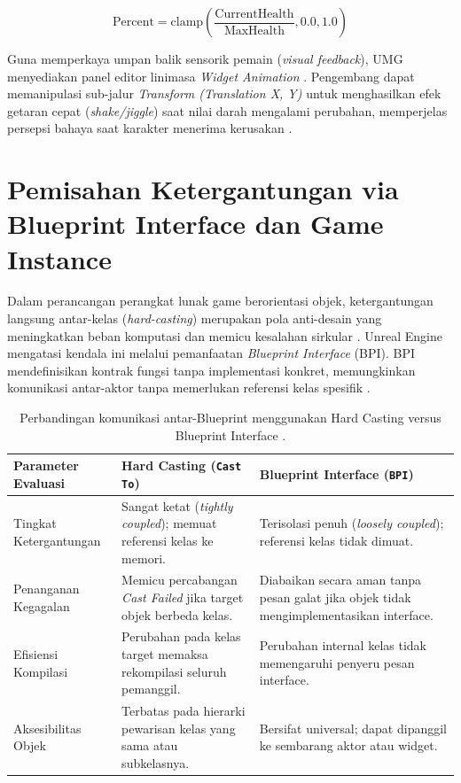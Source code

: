 \documentclass[a4paper,oneside,12pt]{report}
\begin{document}
\begin{equation}
	\text{Percent} = \text{clamp}\left(\frac{\text{CurrentHealth}}{\text{MaxHealth}}, 0.0, 1.0\right)
\end{equation}

Guna memperkaya umpan balik sensorik pemain (\textit{visual feedback}), UMG menyediakan panel editor linimasa \textit{Widget Animation} \cite{epic-widget-animation}. Pengembang dapat memanipulasi sub-jalur \textit{Transform (Translation X, Y)} untuk menghasilkan efek getaran cepat (\textit{shake/jiggle}) saat nilai darah mengalami perubahan, memperjelas persepsi bahaya saat karakter menerima kerusakan \cite{modul7}.

\section{Pemisahan Ketergantungan via Blueprint Interface dan Game Instance}
Dalam perancangan perangkat lunak game berorientasi objek, ketergantungan langsung antar-kelas (\textit{hard-casting}) merupakan pola anti-desain yang meningkatkan beban komputasi dan memicu kesalahan sirkular \cite{epic-blueprint-interface}. Unreal Engine mengatasi kendala ini melalui pemanfaatan \textit{Blueprint Interface} (BPI). BPI mendefinisikan kontrak fungsi tanpa implementasi konkret, memungkinkan komunikasi antar-aktor tanpa memerlukan referensi kelas spesifik \cite{epic-blueprint-interface}.

\begin{table}[H]
	\centering
	\renewcommand{\arraystretch}{1.25}
	\caption{Perbandingan komunikasi antar-Blueprint menggunakan Hard Casting versus Blueprint Interface \cite{epic-blueprint-interface,modul7}.}
	\label{tab:komparasi-casting-interface}
	\begin{tabularx}{\linewidth}{|l|Y|Y|}
		\hline
		\textbf{Parameter Evaluasi} & \textbf{Hard Casting (\texttt{Cast To})} & \textbf{Blueprint Interface (\texttt{BPI})} \\
		\hline
		Tingkat Ketergantungan & Sangat ketat (\textit{tightly coupled}); memuat referensi kelas ke memori. & Terisolasi penuh (\textit{loosely coupled}); referensi kelas tidak dimuat. \\
		\hline
		Penanganan Kegagalan & Memicu percabangan \textit{Cast Failed} jika target objek berbeda kelas. & Diabaikan secara aman tanpa pesan galat jika objek tidak mengimplementasikan interface. \\
		\hline
		Efisiensi Kompilasi & Perubahan pada kelas target memaksa rekompilasi seluruh pemanggil. & Perubahan internal kelas tidak memengaruhi penyeru pesan interface. \\
		\hline
		Aksesibilitas Objek & Terbatas pada hierarki pewarisan kelas yang sama atau subkelasnya. & Bersifat universal; dapat dipanggil ke sembarang aktor atau widget. \\
		\hline
	\end{tabularx}
\end{table}
\end{document}
